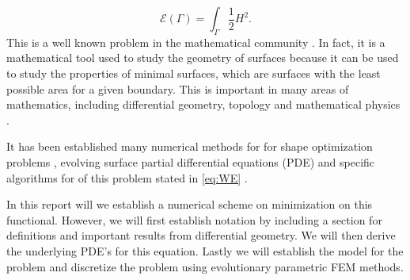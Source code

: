 \begin{equation}
\label{eq:WE}
\mathcal{E} \left( \Gamma  \right) = \int_{\Gamma }^{} \frac{1}{2} H ^2
.\end{equation}
This is a well known problem in the mathematical community \cite{ topping2000towards, marques2014willmore,link2013gradient}. In fact, it is a mathematical tool used to study the geometry of surfaces because it can be used to study the properties of minimal surfaces, which are surfaces with the least possible area for a given boundary. This is important in many areas of mathematics, including differential geometry, topology and mathematical physics \cite{koerber2021area,jakob2022singularities, rupp21}.



It has been established many numerical methods for for shape optimization problems \cite{sokolowski1992introduction,ito2008variational}, evolving surface partial differential equations (PDE) \cite{dziuk2013finite,dziuk2007finite} and specific
algorithms for of this problem stated in \eqref{eq:WE}  \cite{palmurella2022parametric,hu2022evolving}.


In this report will we establish a numerical scheme on minimization on this functional. However, we will first establish notation by including a section for definitions and important results from differential geometry. We will then derive the underlying PDE's for this equation. Lastly we will establish the model for the problem and discretize the problem using evolutionary parametric FEM methods.



